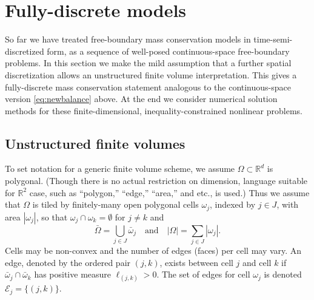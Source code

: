 \documentclass[final,onefignum]{siamart190516}
\newcommand\RR{\mathbb{R}}
\begin{document}
\section{Fully-discrete models}  \label{sec:spacediscretized}

So far we have treated free-boundary mass conservation models in time-semi-discretized form, as a sequence of well-posed continuous-space free-boundary problems.  In this section we make the mild assumption that a further spatial discretization allows an unstructured finite volume \cite{LeVeque2002} interpretation.  This gives a fully-discrete mass conservation statement analogous to the continuous-space version \eqref{eq:newbalance} above.  At the end we consider numerical solution methods for these finite-dimensional, inequality-constrained nonlinear problems.

\subsection{Unstructured finite volumes} \label{subsec:spacenotation}  To set notation for a generic finite volume scheme, we assume $\Omega \subset \RR^d$ is polygonal.  (Though there is no actual restriction on dimension, language suitable for $\RR^2$ case, such as ``polygon,'' ``edge,'' ``area,'' and etc., is used.)  Thus we assume that $\Omega$ is tiled by finitely-many open polygonal cells $\omega_j$, indexed by $j\in J$, with area $|\omega_j|$, so that $\omega_j \cap \omega_k = \emptyset$ for $j\ne k$ and
\begin{equation}
\bar\Omega = \bigcup_{j\in J} \bar \omega_j \quad \text{and} \quad |\Omega| = \sum_{j\in J} |\omega_j|.  \label{eq:tiling}
\end{equation}
Cells may be non-convex and the number of edges (faces) per cell may vary.  An edge, denoted by the ordered pair $(j,k)$, exists between cell $j$ and cell $k$ if $\bar\omega_j \cap \bar \omega_k$ has positive measure $\ell_{(j,k)}>0$.  The set of edges for cell $\omega_j$ is denoted $\mathcal{E}_j=\{(j,k)\}$.
\end{document}
